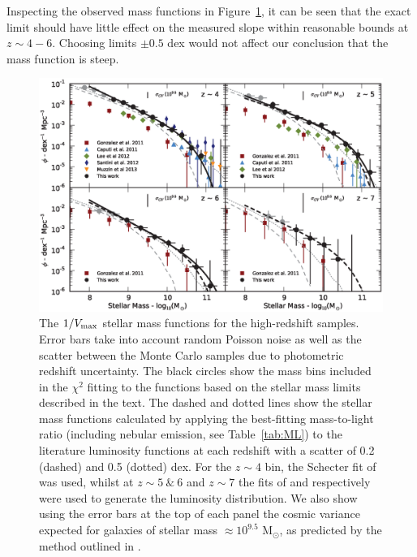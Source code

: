 Inspecting the observed mass functions in Figure~\ref{fig:massfunctions}, it can be seen that the exact limit should have little effect on the measured slope within reasonable bounds at $z \sim 4-6$. Choosing limits $\pm 0.5$ dex would not affect our conclusion that the mass function is steep.

\begin{figure}
\includegraphics[width=\textwidth]{plots/fig9.eps}
\caption{The $1/V_{\rm{max}}$ stellar mass functions for the high-redshift samples. Error bars take into account random Poisson noise as well as the scatter between the Monte Carlo samples due to photometric redshift uncertainty. The black circles show the mass bins included in the $\chi^2$ fitting to the \citet{Schechter:1976gl} functions based on the stellar mass limits described in the text. The dashed and dotted lines show the stellar mass functions calculated by applying the best-fitting mass-to-light ratio (including nebular emission, see Table~\ref{tab:ML}) to the literature luminosity functions at each redshift with a scatter of 0.2 (dashed) and 0.5 (dotted) dex. For the $z\sim4$ bin, the Schecter fit of \citet{2007ApJ...670..928B} was used, whilst at $z\sim5~\&~6$ and $z\sim7$ the fits of \citet{Anonymous:96uKWdy6} and \citet{McLure:2013hh} respectively were used to generate the luminosity distribution. We also show using the error bars at the top of each panel the cosmic variance expected for galaxies of stellar mass $\approx 10^{9.5}$ M$_{\odot}$, as predicted by the method outlined in \citet{Moster:2011ip}.}
\label{fig:massfunctions}
\end{figure}

